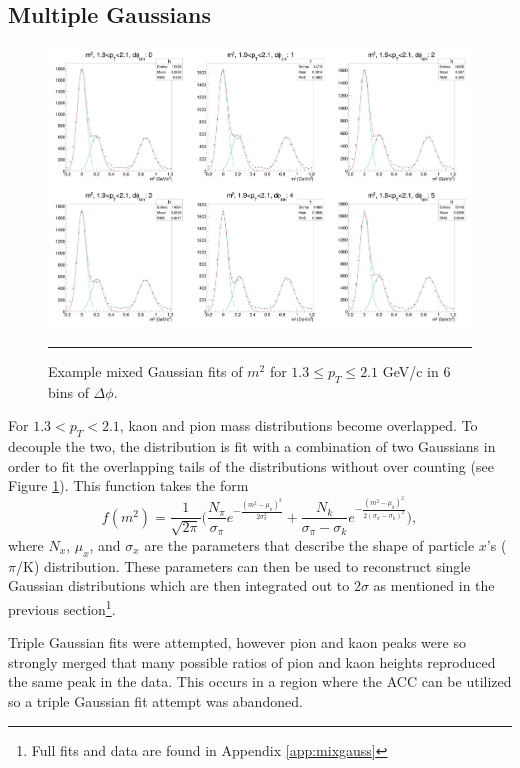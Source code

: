 \subsection{Multiple Gaussians}
\begin{figure}[htb!]
  \centering
    \includegraphics[width=1\textwidth]{lowptfits/yieldvsdphi_tof1_cent0_ch1_pT-19-21.jpg}
    \rule{35em}{0.5pt}
  \caption[Example mixed Gaussian fits of $m^2$ for $1.3 \leq p_T\leq 2.1$ GeV/c in 6 bins of $\Delta \phi$.]{Example mixed Gaussian fits of $m^2$ for $1.3 \leq p_T\leq 2.1$ GeV/c in 6 bins of $\Delta \phi$.}
  \label{fig:mixgausm2}
\end{figure}
For $1.3<p_T<2.1$, kaon and pion mass distributions become overlapped. To decouple the two, the distribution is fit with a combination of two Gaussians in order to fit the overlapping tails of the distributions without over counting (see Figure \ref{fig:mixgausm2}). This function takes the form
\begin{equation}
f(m^2) = \frac{1}{\sqrt{2\pi}} \bigg( \frac{N_{\pi}}{\sigma_{\pi}} e^{-\frac{(m^2-\mu_{\pi})^2}{2\sigma_{\pi}^{2}}} + \frac{N_{k}}{\sigma_{\pi}-\sigma_{k}} e^{-\frac{(m^2-\mu_{k})^2}{2(\sigma_{\pi} - \sigma_{k})^{2}}} \bigg),
\end{equation}
where $N_{x}$, $\mu_x$, and $\sigma_x$ are the parameters that describe the shape of particle $x$'s ($\pi$/K) distribution. These parameters can then be used to reconstruct single Gaussian distributions which are then integrated out to $2\sigma$ as mentioned in the previous section\footnote{Full fits and data are found in Appendix \ref{app:mixgauss}}.

Triple Gaussian fits were attempted, however pion and kaon peaks were so strongly merged that many possible ratios of pion and kaon heights reproduced the same peak in the data. This occurs in a region where the ACC can be utilized so a triple Gaussian fit attempt was abandoned.

